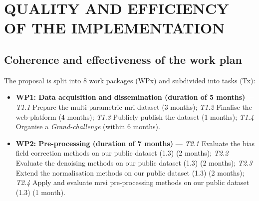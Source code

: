 \section{QUALITY AND EFFICIENCY OF THE IMPLEMENTATION}
\label{sec:implementation}

\subsection{Coherence and effectiveness of the work plan}

The proposal is split into 8 work packages (WPx) and subdivided into tasks (Tx):

\begin{itemize}[noitemsep]
\item[] \textbf{WP1: Data acquisition and dissemination (duration of 5 months)} ---
  \textit{T1.1} Prepare the multi-parametric \ac{mri} dataset (3 months);
  \textit{T1.2} Finalise the web-platform (4 months);
  \textit{T1.3} Publicly publish the dataset (1 months);
  \textit{T1.4} Organise a \emph{Grand-challenge} (within 6 months).
\item[] \textbf{WP2: Pre-processing (duration of 7 months)} ---
  \textit{T2.1} Evaluate the bias field correction methods on our public dataset (1.3) (2 months);
  \textit{T2.2} Evaluate the denoising methods on our public dataset (1.3) (2 months);
  \textit{T2.3} Extend the normalisation methods on our public dataset (1.3) (2 months);
  \textit{T2.4} Apply and evaluate \ac{mrsi} pre-processing methods on our public dataset (1.3) (1 month).

\end{itemize}
